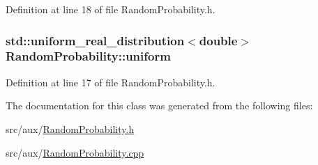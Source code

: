 Definition at line 18 of file Random\-Probability.\-h.

\hypertarget{class_random_probability_a1bad4faa982f0fc1e9169c073ec53295}{
\subsubsection[{uniform}]{\setlength{\rightskip}{0pt plus 5cm}std\-::uniform\-\_\-real\-\_\-distribution$<$double$>$ Random\-Probability\-::uniform\hspace{0.3cm}{\ttfamily [protected]}}}\label{class_random_probability_a1bad4faa982f0fc1e9169c073ec53295}


Definition at line 17 of file Random\-Probability.\-h.



The documentation for this class was generated from the following files\-:\begin{DoxyCompactItemize}
\item 
src/aux/\hyperlink{_random_probability_8h}{Random\-Probability.\-h}\item 
src/aux/\hyperlink{_random_probability_8cpp}{Random\-Probability.\-cpp}\end{DoxyCompactItemize}
